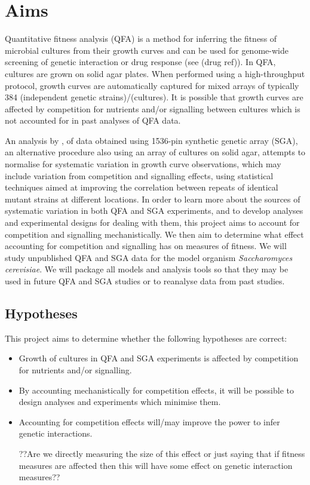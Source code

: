 
\section{Aims}
\label{sec:aims}
Quantitative fitness analysis (QFA) is a method for inferring the
fitness of microbial cultures from their growth curves and can be used
for genome-wide screening of genetic interaction or drug response (see
\citet{Addinall2008,Addinall2011,Lawless2010,Banks2012} (drug
ref)). In QFA, cultures are grown on solid agar plates. When performed
using a high-throughput protocol, growth curves are automatically
captured for mixed arrays of typically 384 (independent genetic
strains)/(cultures). It is possible that growth curves are affected by
competition for nutrients and/or signalling between cultures which is
not accounted for in past analyses of QFA data.

An analysis by \citet{Baryshnikova2010}, of data obtained using
1536-pin synthetic genetic array (SGA), an alternative procedure also
using an array of cultures on solid agar, attempts to normalise for
systematic variation in growth curve observations, which may include
variation from competition and signalling effects, using statistical
techniques aimed at improving the correlation between repeats of
identical mutant strains at different locations. In order to learn
more about the sources of systematic variation in both QFA and SGA
experiments, and to develop analyses and experimental designs for
dealing with them, this project aims to account for competition and
signalling mechanistically. We then aim to determine what effect
accounting for competition and signalling has on measures of
fitness. We will study unpublished QFA and SGA data for the model
organism \textit{Saccharomyces cerevisiae}. We will package all models
and analysis tools so that they may be used in future QFA and SGA
studies or to reanalyse data from past studies.

\subsection{Hypotheses}
This project aims to determine whether
the following hypotheses are correct:
\begin{itemize}
\item %
  Growth of cultures in QFA and SGA experiments is affected by
  competition for nutrients and/or signalling.
\item By accounting mechanistically for competition effects, it will
  be possible to design analyses and experiments which minimise them.
\item Accounting for competition effects will/may improve the power to
  infer genetic interactions.

  ??Are we directly measuring the size of this effect or just saying
  that if fitness measures are affected then this will have some
  effect on genetic interaction measures??
\end{itemize}

